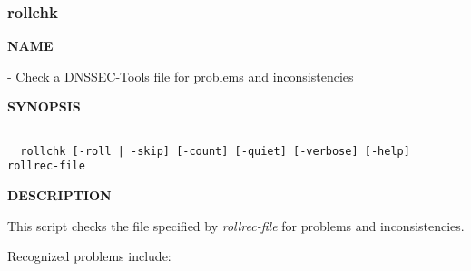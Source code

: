 \clearpage

\subsubsection{rollchk}

{\bf NAME}

 - Check a DNSSEC-Tools  file for problems and
inconsistencies

{\bf SYNOPSIS}

\begin{verbatim}

  rollchk [-roll | -skip] [-count] [-quiet] [-verbose] [-help] rollrec-file

\end{verbatim}

{\bf DESCRIPTION}

This script checks the  file specified by {\it rollrec-file}
for problems and inconsistencies.

Recognized problems include:

